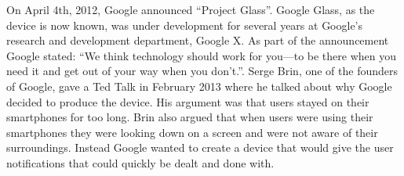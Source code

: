 








On April 4th, 2012, Google announced ``Project Glass''.\cite{GoogleGlassConcept} Google Glass, as the device is now known, was under development for several years at Google's research and development department, Google X. As part of the announcement Google stated:  ``We think technology should work for you---to be there when you need it and get out of your way when you don’t.''.\cite{GoogleGlassAnnouncement} Serge Brin, one of the founders of Google, gave a Ted Talk in February 2013\cite{tedtalkWhyGlass} where he talked about why Google decided to produce the device. His argument was that users stayed on their smartphones for too long. Brin also argued that when users were using their smartphones they were looking down on a screen and were not aware of their surroundings. Instead Google wanted to create a device that would give the user notifications that could quickly be dealt and done with.\\


